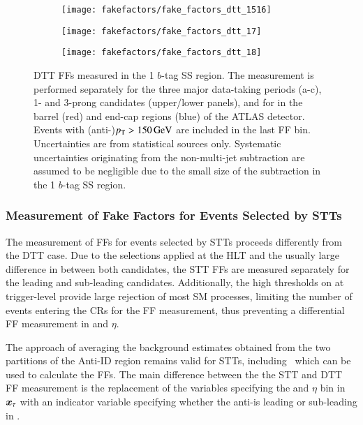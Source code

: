 \begin{figure}[htbp]
  \centering

  \begin{subfigure}{0.495\textwidth}
    \texttt{[image: fakefactors/fake\_factors\_dtt\_1516]}
  \end{subfigure}
  \begin{subfigure}{0.495\textwidth}
    \texttt{[image: fakefactors/fake\_factors\_dtt\_17]}
  \end{subfigure}

  \begin{subfigure}{0.495\textwidth}
    \texttt{[image: fakefactors/fake\_factors\_dtt\_18]}
  \end{subfigure}

  \caption{DTT FFs measured in the 1 $b$-tag SS region. The measurement is
    performed separately for the three major data-taking periods (a-c), 1- and
    3-prong \tauhadvis candidates (upper/lower panels), and for \tauhadvis in
    the barrel (red) and end-cap regions (blue) of the ATLAS detector. Events
    with (anti-)\tauhadvis $p_{\text{T}} > \SI{150}{\ensuremath{\text{GeV}}}$ are included in the last FF
    bin. Uncertainties are from statistical sources only. Systematic
    uncertainties originating from the non-multi-jet subtraction are assumed to
    be negligible due to the small size of the subtraction in the 1 $b$-tag SS
    region.}%
  \label{fig:mjfakes_fake_factors}
\end{figure}


\subsubsection{Measurement of Fake Factors for Events Selected by STTs}

The measurement of FFs for events selected by STTs proceeds differently from the
DTT case. Due to the selections applied at the HLT and the usually large
difference in \pT between both \tauhadvis candidates, the STT FFs are measured
separately for the leading and sub-leading \tauhadvis candidates. Additionally,
the high \pT thresholds on \tauhadvis at trigger-level provide large rejection
of most SM processes, limiting the number of events entering the CRs for the FF
measurement, thus preventing a differential FF measurement in \tauhadvis \pT and
$\eta$.

The approach of averaging the background estimates obtained from the two
partitions of the Anti-ID region remains valid for STTs,
including~ which can be used to calculate the
FFs. The main difference between the the STT and DTT FF measurement is the
replacement of the variables specifying the \pT and $\eta$ bin in
$\bm{x}_\tau$ with an indicator variable specifying whether the
anti-\tauhadvis is leading or sub-leading in \pT.

